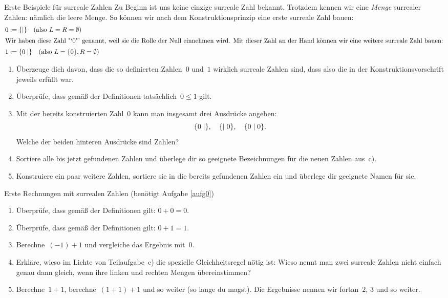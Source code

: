 \documentclass{zirkelblatt}
\begin{document}
\begin{aufgabe}{Erste Beispiele für surreale Zahlen}
\label{aufg0}
Zu Beginn ist uns keine einzige surreale Zahl bekannt. Trotzdem kennen wir
eine \emph{Menge} surrealer Zahlen: nämlich die leere Menge. So können wir nach
dem Konstruktionsprinzip eine erste surreale Zahl bauen:
\begin{align*}
  0 &:= \{  \mathrel{|}  \} \quad\text{(also $L = R = \emptyset$)} \\
\intertext{Wir haben diese Zahl~"`$0$"' genannt, weil sie die Rolle der Null einnehmen
wird. Mit dieser Zahl an der Hand können wir eine weitere surreale Zahl bauen:}
  1 &:= \{ 0 \mathrel{|}  \} \quad\text{(also $L = \{ 0 \}, R = \emptyset$)}
\end{align*}

\begin{enumerate}
\item Überzeuge dich davon, dass die so definierten Zahlen~$0$ und~$1$ wirklich
surreale Zahlen sind, dass also die  in der Konstruktionsvorschrift
jeweils erfüllt war.

\item Überprüfe, dass gemäß der Definitionen tatsächlich~$0 \leq 1$ gilt.

\item Mit der bereits konstruierten Zahl~$0$ kann man insgesamt drei Ausdrücke
angeben:
\[ \{ 0 \mathrel{|}  \}, \quad \{  \mathrel{|} 0 \}, \quad \{ 0 \mathrel{|} 0 \}. \]
Welche der beiden hinteren Ausdrücke sind Zahlen?

\item Sortiere alle bis jetzt gefundenen Zahlen und überlege dir so geeignete
Bezeichnungen für die neuen Zahlen aus~c).

\item Konstruiere ein paar weitere Zahlen, sortiere sie in die bereits
gefundenen Zahlen ein und überlege dir geeignete Namen für sie.
\end{enumerate}
\end{aufgabe}

\begin{aufgabe}{Erste Rechnungen mit surrealen Zahlen (benötigt Aufgabe \ref{aufg0})}
\label{erste-rechnungen}
\begin{enumerate}
\item Überprüfe, dass gemäß der Definitionen gilt: $0 + 0 = 0$.
\item Überprüfe, dass gemäß der Definitionen gilt: $0 + 1 = 1$.
\item Berechne~$(-1) + 1$ und vergleiche das Ergebnis mit~$0$.
\item Erkläre, wieso im Lichte von Teilaufgabe~c) die spezielle
Gleichheitsregel nötig ist: Wieso nennt man zwei surreale Zahlen nicht einfach
genau dann gleich, wenn ihre linken und rechten Mengen übereinstimmen?
\item Berechne~$1 + 1$, berechne~$(1 + 1) + 1$ und so weiter (so lange du
magst). Die Ergebnisse nennen wir fortan~$2$, $3$ und so weiter.
\end{enumerate}
\end{aufgabe}
\end{document}
